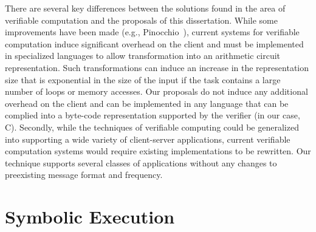 There are several key differences between the solutions found in the
area of verifiable computation and the proposals of this dissertation.
While some improvements have been made (e.g.,
Pinocchio~\cite{parno13:pinocchio}), current systems for verifiable
computation induce significant overhead on the client and must be
implemented in specialized languages to allow transformation into an
arithmetic circuit representation. Such transformations can induce 
an increase in the representation size that is exponential
in the size of the input if the task contains a large
number of loops or memory accesses. Our proposals do not induce any
additional overhead on the client and can be implemented in any
language that can be complied into a byte-code representation
supported by the verifier (in our case, C). Secondly, while the
techniques of verifiable computing could be generalized into
supporting a wide variety of client-server applications, current
verifiable computation systems would require existing implementations 
to be rewritten.
Our technique supports several classes of applications without any
changes to preexisting message format and frequency. 

\section{Symbolic Execution}
\label{ch:background:symbex}

